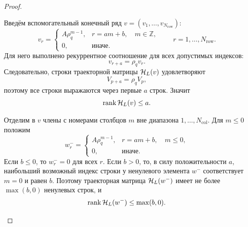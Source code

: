 \begin{proof}
\begin{enumerate}
    Введём вспомогательный конечный ряд $v=(v_1,\dots,v_{N_{\mathrm{row}}})$:
    \begin{equation}
        v_r
        =
        \begin{cases}
            A\rho_q^{m-1}, & r=am+b,\quad m\in\mathbb Z,\\
            0, & \text{иначе}.
        \end{cases}
        \qquad
        r=1,\dots,N_{\mathrm{row}}.
        \label{eq:v-definition}
    \end{equation}
    Для него выполнено рекуррентное соотношение для всех допустимых индексов:
    \begin{equation}
        v_{r+a}=\rho_q v_r.
        \label{eq:v-recursion}
    \end{equation}
    Следовательно, строки траекторной матрицы $\mathcal H_L(v)$ удовлетворяют
    \begin{equation*}
        V_{p+a}=\rho_q V_p,
    \end{equation*}
    поэтому все строки выражаются через первые $a$ строк. Значит
    \begin{equation}
        \operatorname{rank}\mathcal H_L(v)\le a.
        \label{eq:rank-v}
    \end{equation}

    Отделим в $v$ члены с номерами столбцов $m$ вне диапазона
    $1,\dots,N_{\mathrm{col}}$. Для $m\le0$ положим
    \begin{equation}
        w^-_r
        =
        \begin{cases}
            A\rho_q^{m-1}, & r=am+b,\quad m\le0,\\
            0, & \text{иначе}.
        \end{cases}
        \label{eq:w-minus}
    \end{equation}
    Если $b\le0$, то $w^-_r=0$ для всех $r$. Если $b>0$, то, в силу
    положительности $a$, наибольший
    возможный индекс строки у ненулевого элемента $w^-$ соответствует $m=0$
    и равен $b$. Поэтому траекторная матрица $\mathcal H_L(w^-)$ имеет не более
    $\max(b,0)$ ненулевых строк, и
    \begin{equation}
        \operatorname{rank}\mathcal H_L(w^-)
        \le
        \max(b,0).
        \label{eq:rank-w-minus}
    \end{equation}


\end{enumerate}
\end{proof}
